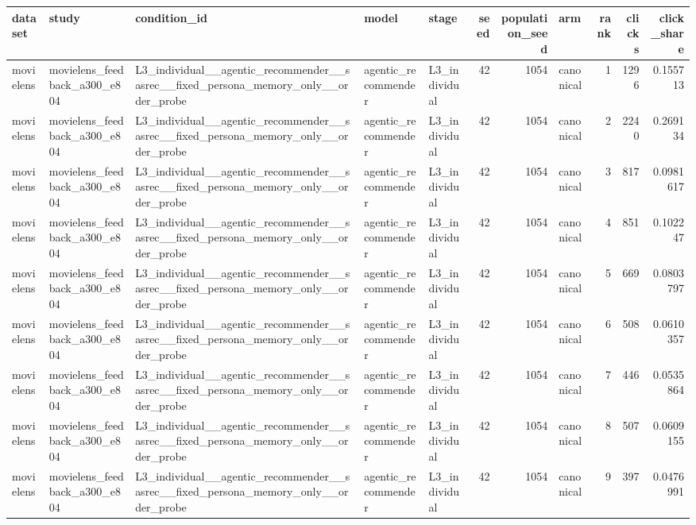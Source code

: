 \begin{table}[htbp!]
\centering
\small
\setlength{\tabcolsep}{3pt}
\renewcommand{\arraystretch}{1.1}
\begin{tabular}{lllllrrlrrr}
\hline
dataset & study & condition\_id & model & stage & seed & population\_seed & arm & rank & clicks & click\_share \\
\hline
movielens & movielens\_feedback\_a300\_e804 & L3\_individual\_\_agentic\_recommender\_\_sasrec\_\_fixed\_persona\_memory\_only\_\_order\_probe & agentic\_recommender & L3\_individual & 42 & 1054 & canonical & 1 & 1296 & 0.155713 \\
movielens & movielens\_feedback\_a300\_e804 & L3\_individual\_\_agentic\_recommender\_\_sasrec\_\_fixed\_persona\_memory\_only\_\_order\_probe & agentic\_recommender & L3\_individual & 42 & 1054 & canonical & 2 & 2240 & 0.269134 \\
movielens & movielens\_feedback\_a300\_e804 & L3\_individual\_\_agentic\_recommender\_\_sasrec\_\_fixed\_persona\_memory\_only\_\_order\_probe & agentic\_recommender & L3\_individual & 42 & 1054 & canonical & 3 & 817 & 0.0981617 \\
movielens & movielens\_feedback\_a300\_e804 & L3\_individual\_\_agentic\_recommender\_\_sasrec\_\_fixed\_persona\_memory\_only\_\_order\_probe & agentic\_recommender & L3\_individual & 42 & 1054 & canonical & 4 & 851 & 0.102247 \\
movielens & movielens\_feedback\_a300\_e804 & L3\_individual\_\_agentic\_recommender\_\_sasrec\_\_fixed\_persona\_memory\_only\_\_order\_probe & agentic\_recommender & L3\_individual & 42 & 1054 & canonical & 5 & 669 & 0.0803797 \\
movielens & movielens\_feedback\_a300\_e804 & L3\_individual\_\_agentic\_recommender\_\_sasrec\_\_fixed\_persona\_memory\_only\_\_order\_probe & agentic\_recommender & L3\_individual & 42 & 1054 & canonical & 6 & 508 & 0.0610357 \\
movielens & movielens\_feedback\_a300\_e804 & L3\_individual\_\_agentic\_recommender\_\_sasrec\_\_fixed\_persona\_memory\_only\_\_order\_probe & agentic\_recommender & L3\_individual & 42 & 1054 & canonical & 7 & 446 & 0.0535864 \\
movielens & movielens\_feedback\_a300\_e804 & L3\_individual\_\_agentic\_recommender\_\_sasrec\_\_fixed\_persona\_memory\_only\_\_order\_probe & agentic\_recommender & L3\_individual & 42 & 1054 & canonical & 8 & 507 & 0.0609155 \\
movielens & movielens\_feedback\_a300\_e804 & L3\_individual\_\_agentic\_recommender\_\_sasrec\_\_fixed\_persona\_memory\_only\_\_order\_probe & agentic\_recommender & L3\_individual & 42 & 1054 & canonical & 9 & 397 & 0.0476991 \\

\end{tabular}
\end{table}
